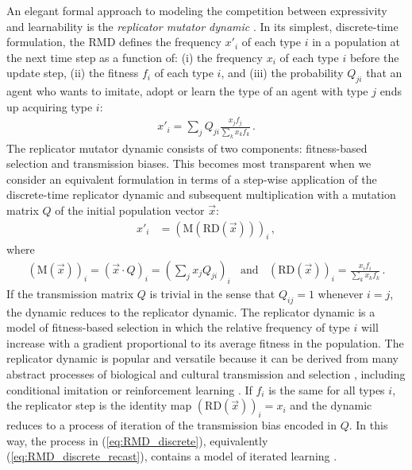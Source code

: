 \documentclass[a4paper]{article}
\begin{document}
An elegant formal approach to modeling the competition between expressivity and learnability is
the \emph{replicator mutator dynamic}
\citep{Hofbauer1985:The-Selection-M,nowak+etal:2000,NowakKomarova2001:Evolution-of-Un,hofbauer+sigmund:2003,Nowak2006:Evolutionary-Dy}. In
its simplest, discrete-time formulation, the RMD defines the frequency $x'_i$ of each type $i$
in a population at the next time step as a function of: (i) the frequency $x_i$ of each type
$i$ before the update step, (ii) the fitness $f_i$ of each type $i$, and (iii) the probability
$Q_{ji}$ that an agent who wants to imitate, adopt or learn the type of an agent with type $j$
ends up acquiring type $i$:
\begin{align}
  \label{eq:RMD_discrete}
  x'_i = \sum_j Q_{ji} \frac{x_jf_j}{\sum_k x_k f_k}\,.
\end{align}
The replicator mutator dynamic consists of two components: fitness-based selection and
transmission biases. This becomes most transparent when we consider an equivalent formulation
in terms of a step-wise application of the discrete-time replicator dynamic
\citep{TaylorJonker1978:Evolutionary-St} and subsequent multiplication with a mutation matrix
$Q$ of the initial population vector $\vec{x}$:
\begin{align}
  \label{eq:RMD_discrete_recast}
  x'_i & = (\text{M}(\text{RD}(\vec{x})))_i\,,
\end{align}
where
\begin{align*}
  (\text{M}(\vec{x}))_i = (\vec{x} \cdot Q)_i = \left ( \sum_j
          x_j Q_{ji} \right)_i \ \ \ \ \text{and} \ \ \ \ 
      \left ( \text{RD}(\vec{x}) \right )_i 
         = \frac{x_i f_i}{\sum_k x_k f_k}\,.
 \end{align*}
 If the transmission matrix $Q$ is trivial in the sense that $Q_{ij}=1$ whenever $i=j$, the
 dynamic reduces to the replicator dynamic. The replicator dynamic is a model of fitness-based
 selection in which the relative frequency of type $i$ will increase with a gradient
 proportional to its average fitness in the population. The replicator dynamic is popular and
 versatile because it can be derived from many abstract processes of biological and cultural
 transmission and selection \citep[for overview and any derivations
 see][]{Sandholm2010:Population-Game}, including conditional imitation
 \citep[e.g.][]{Helbing1996:A-Stochastic-Be,Schlag1998:Why-Imitate-and} or reinforcement
 learning \citep[e.g.][]{BorgersSarin997:Learning-Throug,Beggs2005:On-the-Converge}. If $f_i$
 is the same for all types $i$, the replicator step is the identity map
 $ \left ( \text{RD}(\vec{x}) \right )_i = x_i$ and the dynamic reduces to a process of
 iteration of the transmission bias encoded in $Q$. In this way, the process in
 (\ref{eq:RMD_discrete}), equivalently (\ref{eq:RMD_discrete_recast}), contains a model of
 iterated learning \citep{griffiths+kalish:2007}.
\end{document}
